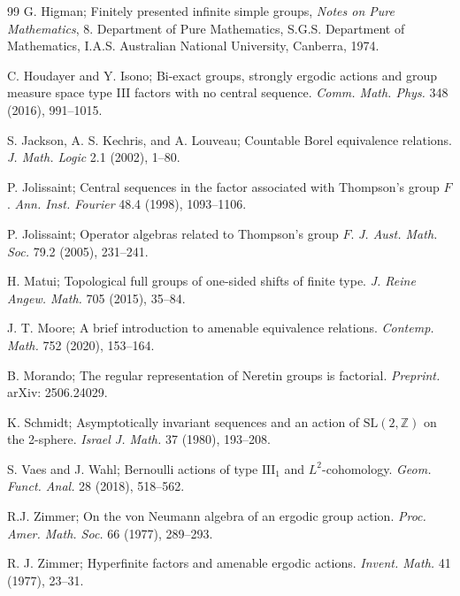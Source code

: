 \documentclass{amsart}
\theoremstyle{remark}
\theoremstyle{definition}
\begin{document}
\begin{thebibliography}{99}
 G. Higman; Finitely presented infinite simple groups, \emph{Notes on Pure Mathematics}, 8. Department of Pure Mathematics, S.G.S. Department of Mathematics, I.A.S. Australian National University, Canberra, 1974.

 C. Houdayer and Y. Isono; Bi-exact groups, strongly ergodic actions and group measure space type \textrm{III} factors with no central sequence. \emph{Comm. Math. Phys.} 348 (2016), 991--1015.

 S. Jackson, A. S. Kechris, and A. Louveau; Countable Borel equivalence relations. \emph{J. Math. Logic} 2.1 (2002), 1--80.

 P. Jolissaint; Central sequences in the factor associated with Thompson's group $F$. \emph{Ann. Inst. Fourier} 48.4 (1998), 1093--1106.

 P. Jolissaint; Operator algebras related to Thompson's group $F$. \emph{J. Aust. Math. Soc.} 79.2 (2005), 231--241.

 H. Matui; Topological full groups of one-sided shifts of finite type. \emph{J. Reine Angew. Math.} 705 (2015), 35--84.

 J. T. Moore; A brief introduction to amenable equivalence relations. \emph{Contemp. Math.} 752 (2020), 153--164.

 B. Morando; The regular representation of Neretin groups is factorial. \emph{Preprint.} arXiv: 2506.24029.

 K. Schmidt; Asymptotically invariant sequences and an action of $\mathrm{SL}(2, \mathbb{Z})$ on the 2-sphere. \emph{Israel J. Math.} 37 (1980), 193--208. 

 S. Vaes and J. Wahl; Bernoulli actions of type $\mathrm{III}_1$ and $L^2$-cohomology. \emph{Geom. Funct. Anal.} 28 (2018), 518--562.

 R.J. Zimmer; On the von Neumann algebra of an ergodic group action. \emph{Proc. Amer. Math. Soc.} 66 (1977), 289--293.

 R. J. Zimmer; Hyperfinite factors and amenable ergodic actions. \emph{Invent. Math.} 41 (1977), 23--31.



\end{thebibliography}
\end{document}
